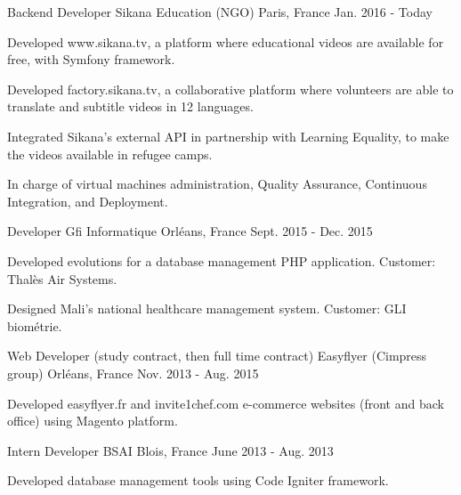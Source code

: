 \begin{cventries}
  \cventry
    {Backend Developer}
    {Sikana Education (NGO)}
    {Paris, France}
    {Jan. 2016 - Today}
    {
      \begin{cvitems}
        \item {Developed www.sikana.tv, a platform where educational videos are available for free, with Symfony framework.}
        \item {Developed factory.sikana.tv, a collaborative platform where volunteers are able to translate and subtitle videos in 12 languages.}
        \item {Integrated Sikana's external API in partnership with Learning Equality, to make the videos available in refugee camps.}
        \item {In charge of virtual machines administration, Quality Assurance, Continuous Integration, and Deployment.}
      \end{cvitems}
    }
  \cventry
    {Developer}
    {Gfi Informatique}
    {Orléans, France}
    {Sept. 2015 - Dec. 2015}
    {
      \begin{cvitems}
        \item {Developed evolutions for a database management PHP application. Customer: Thalès Air Systems.}
        \item {Designed Mali's national healthcare management system. Customer: GLI biométrie.}
      \end{cvitems}
    }
  \cventry
    {Web Developer (study contract, then full time contract)}
    {Easyflyer (Cimpress group)}
    {Orléans, France}
    {Nov. 2013 - Aug. 2015}
    {
      \begin{cvitems}
        \item {Developed easyflyer.fr and invite1chef.com e-commerce websites (front and back office) using Magento platform.}
      \end{cvitems}
    }
  \cventry
    {Intern Developer}
    {BSAI}
    {Blois, France}
    {June 2013 - Aug. 2013}
    {
      \begin{cvitems}
        \item {Developed database management tools using Code Igniter framework.}
      \end{cvitems}
    }
\end{cventries}
